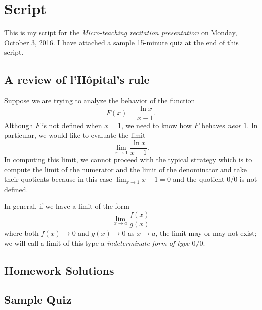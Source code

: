 \documentclass[article,oneside]{memoir}
\begin{document}
%

\author{\textti{\auth}}%
\title{\textti{\tight}}%
\date{\textti{\due}}%

\thispagestyle{empty}
\frontmatter
\maketitle%
\tableofcontents*%
\newpage

\mainmatter
\chapter{Script}
This is my script for the \emph{Micro-teaching recitation presentation} on
Monday, October 3, 2016. I have attached a sample 15-minute quiz at the end
of this script.

\section{A review of l'Hôpital's rule}
Suppose we are trying to analyze the behavior of the function
\[
  F(x)=\frac{\ln x}{x-1}.
\]
Although \(F\) is not defined when \(x=1\), we need to know how \(F\)
behaves \emph{near \(1\)}. In particular, we would like to evaluate the
limit
\begin{equation}
  \label{eq:rec:1}
  \lim_{x\to 1}\frac{\ln x}{x-1}.
\end{equation}
In computing this limit, we cannot proceed with the typical strategy which
is to compute the limit of the numerator and the limit of the denominator
and take their quotients because in this case \(\lim_{x\to 1}x-1=0\) and
the quotient \(0/0\) is not defined.

In general, if we have a limit of the form
\[
  \lim_{x\to a}\frac{f(x)}{g(x)}
\]
where both \(f(x)\to 0\) and \(g(x)\to 0\) as \(x\to a\), the limit may or
may not exist; we will call a limit of this type a \emph{indeterminate form
  of type \(0/0\)}.

\newpage
\section{Homework Solutions}
\newpage
\section{Sample Quiz}
\end{document}
